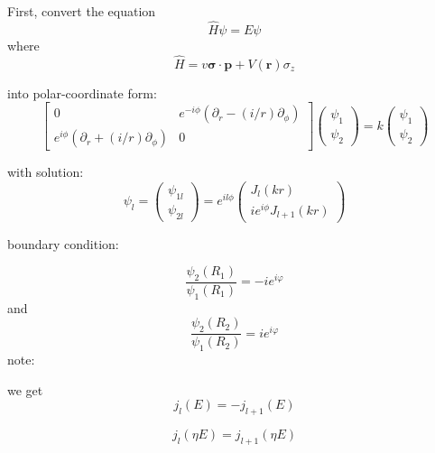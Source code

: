 \documentclass[11pt]{amsart}
\begin{document}
First, convert the equation
$$\hat{H} \psi = E \psi$$
where
$$\hat{H} = v \mathbf{\sigma} \cdot \mathbf{p} + V(\mathbf{r}) \sigma_{z}$$

into polar-coordinate form:
$$\begin{bmatrix} 0 & e^{-i\phi}(\partial_{r} - (i/r)\partial_{\phi}) \\ e^{i\phi}(\partial_{r} + (i/r)\partial_{\phi}) & 0 \end{bmatrix} \left( \begin{array}{c} \psi_1 \\ \psi_2 \end{array} \right) = k \left( \begin{array}{c} \psi_1 \\ \psi_2 \end{array} \right)$$

with solution:
$$ \psi_{l}  = \left( \begin{array}{c} \psi_{1l} \\ \psi_{2l} \end{array} \right) = e^{il\phi}\left( \begin{array}{c} J_{l}(kr) \\ ie^{i\phi}J_{l+1}(kr) \end{array} \right)$$

boundary condition:

$$\frac{\psi_{2}(R_{1})}{\psi_{1}(R_{1})} = -i e^{i\varphi}$$
and
$$\frac{\psi_{2}(R_{2})}{\psi_{1}(R_{2})} = i e^{i\varphi}$$
note:


we get
$$j_l (E) = - j_{l+1} (E)$$

$$j_l (\eta E) =  j_{l+1} (\eta E)$$
\end{document}
